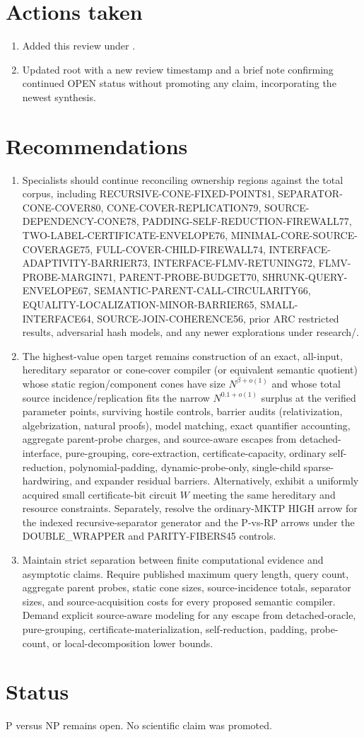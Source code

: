 \documentclass[11pt]{article}
\begin{document}
\section{Actions taken}
\begin{enumerate}
\item Added this review under .
\item Updated root  with a new review timestamp and a brief note confirming continued OPEN status without promoting any claim, incorporating the newest synthesis.
\end{enumerate}

\section{Recommendations}
\begin{enumerate}
\item Specialists should continue reconciling ownership regions against the total corpus, including RECURSIVE-CONE-FIXED-POINT81, SEPARATOR-CONE-COVER80, CONE-COVER-REPLICATION79, SOURCE-DEPENDENCY-CONE78, PADDING-SELF-REDUCTION-FIREWALL77, TWO-LABEL-CERTIFICATE-ENVELOPE76, MINIMAL-CORE-SOURCE-COVERAGE75, FULL-COVER-CHILD-FIREWALL74, INTERFACE-ADAPTIVITY-BARRIER73, INTERFACE-FLMV-RETUNING72, FLMV-PROBE-MARGIN71, PARENT-PROBE-BUDGET70, SHRUNK-QUERY-ENVELOPE67, SEMANTIC-PARENT-CALL-CIRCULARITY66, EQUALITY-LOCALIZATION-MINOR-BARRIER65, SMALL-INTERFACE64, SOURCE-JOIN-COHERENCE56, prior ARC restricted results, adversarial hash models, and any newer explorations under research/.
\item The highest-value open target remains construction of an exact, all-input, hereditary separator or cone-cover compiler (or equivalent semantic quotient) whose static region/component cones have size $N^{\beta+o(1)}$ and whose total source incidence/replication fits the narrow $N^{0.1+o(1)}$ surplus at the verified parameter points, surviving hostile controls, barrier audits (relativization, algebrization, natural proofs), model matching, exact quantifier accounting, aggregate parent-probe charges, and source-aware escapes from detached-interface, pure-grouping, core-extraction, certificate-capacity, ordinary self-reduction, polynomial-padding, dynamic-probe-only, single-child sparse-hardwiring, and expander residual barriers. Alternatively, exhibit a uniformly acquired small certificate-bit circuit $W$ meeting the same hereditary and resource constraints. Separately, resolve the ordinary-MKTP HIGH arrow for the indexed recursive-separator generator and the P-vs-RP arrows under the DOUBLE_WRAPPER and PARITY-FIBERS45 controls.
\item Maintain strict separation between finite computational evidence and asymptotic claims. Require published maximum query length, query count, aggregate parent probes, static cone sizes, source-incidence totals, separator sizes, and source-acquisition costs for every proposed semantic compiler. Demand explicit source-aware modeling for any escape from detached-oracle, pure-grouping, certificate-materialization, self-reduction, padding, probe-count, or local-decomposition lower bounds.
\end{enumerate}

\section{Status}
P versus NP remains open. No scientific claim was promoted.

\end{document}
